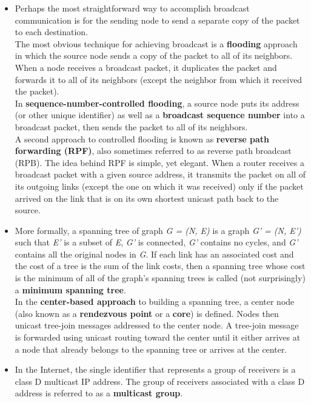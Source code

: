 \begin{itemize}
\item
Perhaps the most straightforward way to accomplish broadcast communication is for the sending node to send a separate copy of the packet to each destination.\\
The most obvious technique for achieving broadcast is a \textbf{flooding} approach in which the source node sends a copy of the packet to all of its neighbors. When a node receives a broadcast packet, it duplicates the packet and forwards it to all of its neighbors (except the neighbor from which it received the packet).\\
In \textbf{sequence-number-controlled flooding}, a source node puts its address (or other unique identifier) as well as a \textbf{broadcast sequence number} into a broadcast packet, then sends the packet to all of its neighbors.\\
A second approach to controlled flooding is known as \textbf{reverse path forwarding (RPF)}, also sometimes referred to as reverse path broadcast (RPB). The idea behind RPF is simple, yet elegant. When a router receives a broadcast packet with a given source address, it transmits the packet on all of its outgoing links (except the one on which it was received) only if the packet arrived on the link that is on its own shortest unicast path back to the source.

\item
More formally, a spanning tree of graph \textit{G = (N, E)} is a graph \textit{G' = (N, E')} such that \textit{E'} is a subset of \textit{E}, \textit{G'} is connected, \textit{G'} contains no cycles, and \textit{G'} contains all the original nodes in \textit{G}. If each link has an associated cost and the cost of a tree is the sum of the link costs, then a spanning tree whose cost is the minimum of all of the graph's spanning trees is called (not surprisingly) a \textbf{minimum spanning tree}.\\
In the \textbf{center-based approach} to building a spanning tree, a center node (also known as a \textbf{rendezvous point} or a \textbf{core}) is defined. Nodes then unicast tree-join messages addressed to the center node. A tree-join message is forwarded using unicast routing toward the center until it either arrives at a node that already belongs to the spanning tree or arrives at the center.

\item
In the Internet, the single identifier that represents a group of receivers is a class D multicast IP address. The group of receivers associated with a class D address is referred to as a \textbf{multicast group}.


\end{itemize}
